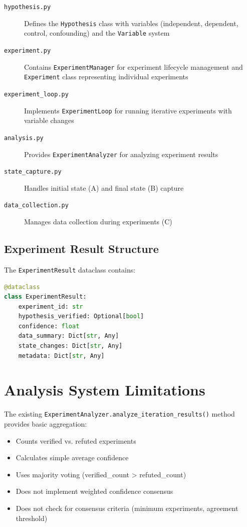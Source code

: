 \documentclass{book}
\begin{document}
\begin{description}
    \item[\texttt{hypothesis.py}] Defines the \texttt{Hypothesis} class with variables (independent, dependent, control, confounding) and the \texttt{Variable} system
    \item[\texttt{experiment.py}] Contains \texttt{ExperimentManager} for experiment lifecycle management and \texttt{Experiment} class representing individual experiments
    \item[\texttt{experiment\_loop.py}] Implements \texttt{ExperimentLoop} for running iterative experiments with variable changes
    \item[\texttt{analysis.py}] Provides \texttt{ExperimentAnalyzer} for analyzing experiment results
    \item[\texttt{state\_capture.py}] Handles initial state (A) and final state (B) capture
    \item[\texttt{data\_collection.py}] Manages data collection during experiments (C)
\end{description}

\subsection{Experiment Result Structure}

The \texttt{ExperimentResult} dataclass contains:

\begin{lstlisting}[language=Python]
@dataclass
class ExperimentResult:
    experiment_id: str
    hypothesis_verified: Optional[bool]
    confidence: float
    data_summary: Dict[str, Any]
    state_changes: Dict[str, Any]
    metadata: Dict[str, Any]
\end{lstlisting}

\section{Analysis System Limitations}

The existing \texttt{ExperimentAnalyzer.analyze\_iteration\_results()} method provides basic aggregation:

\begin{itemize}
    \item Counts verified vs. refuted experiments
    \item Calculates simple average confidence
    \item Uses majority voting (verified\_count > refuted\_count)
    \item Does not implement weighted confidence consensus
    \item Does not check for consensus criteria (minimum experiments, agreement threshold)
\end{itemize}
\end{document}
